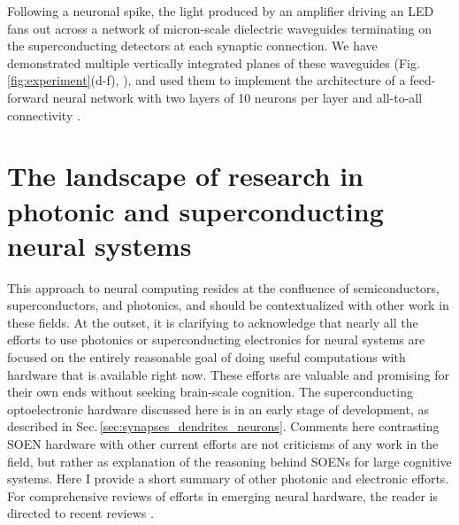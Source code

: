 \documentclass[twocolumn]{article}
\begin{document}
Following a neuronal spike, the light produced by an amplifier driving an LED fans out across a network of micron-scale dielectric waveguides terminating on the superconducting detectors at each synaptic connection. We have demonstrated multiple vertically integrated planes of these waveguides (Fig.\,\ref{fig:experiment}(d-f), \cite{chbu2017}), and used them to implement the architecture of a feed-forward neural network with two layers of 10 neurons per layer and all-to-all connectivity \cite{chbu2018}.

\section{\label{sec:other_approaches}The landscape of research in photonic and superconducting neural systems}
This approach to neural computing resides at the confluence of semiconductors, superconductors, and photonics, and should be contextualized with other work in these fields. At the outset, it is clarifying to acknowledge that nearly all the efforts to use photonics or superconducting electronics for neural systems are focused on the entirely reasonable goal of doing useful computations with hardware that is available right now. These efforts are valuable and promising for their own ends without seeking brain-scale cognition. The superconducting optoelectronic hardware discussed here is in an early stage of development, as described in Sec.\,\ref{sec:synapses_dendrites_neurons}. Comments here contrasting SOEN hardware with other current efforts are not criticisms of any work in the field, but rather as explanation of the reasoning behind SOENs for large cognitive systems. Here I provide a short summary of other photonic and electronic efforts. For comprehensive reviews of efforts in emerging neural hardware, the reader is directed to recent reviews \cite{scpo2017,bexi2020,shta2021}.
\end{document}
